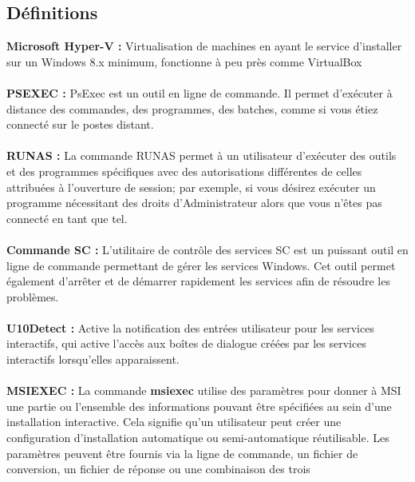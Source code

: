 \documentclass[11pt,a4paper,oneside]{article}
\begin{document}
\subsection{Définitions}
\textbf{Microsoft Hyper-V :} Virtualisation de machines en ayant le service d'installer sur un Windows 8.x minimum, fonctionne à peu près comme VirtualBox
\\ \\
\textbf{PSEXEC :} PsExec est un outil en ligne de commande. Il permet d’exécuter à distance des commandes, des programmes, des batches, comme si vous étiez connecté sur le postes distant.
\\ \\
\textbf{RUNAS :} La commande RUNAS permet à un utilisateur d'exécuter des outils et des programmes spécifiques avec des autorisations différentes de celles attribuées à l'ouverture de session; par exemple, si vous désirez exécuter un programme nécessitant des droits d'Administrateur alors que vous n'êtes pas connecté en tant que tel.
\\ \\
\textbf{Commande SC :} L'utilitaire de contrôle des services SC est un puissant outil en ligne de commande permettant de gérer les services Windows. Cet outil permet également d'arrêter et de démarrer rapidement les services afin de résoudre les problèmes.
\\ \\
\textbf{U10Detect :} Active la notification des entrées utilisateur pour les services interactifs, qui active l'accès aux boîtes de dialogue créées par les services interactifs lorsqu'elles apparaissent.
\\ \\
\textbf{MSIEXEC :} La commande \textbf{msiexec} utilise des paramètres pour donner à MSI une partie ou l'ensemble des informations pouvant être spécifiées au sein d'une installation interactive. Cela signifie qu'un utilisateur peut créer une configuration d'installation automatique ou semi-automatique réutilisable. Les paramètres peuvent être fournis via la ligne de commande, un fichier de conversion, un fichier de réponse ou une combinaison des trois
\newpage
\end{document}

